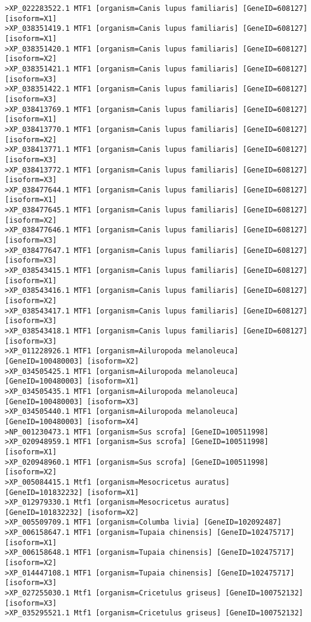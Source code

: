 \begin{lstlisting}[basicstyle=\tiny\ttfamily]
>XP_022283522.1 MTF1 [organism=Canis lupus familiaris] [GeneID=608127] [isoform=X1]
>XP_038351419.1 MTF1 [organism=Canis lupus familiaris] [GeneID=608127] [isoform=X1]
>XP_038351420.1 MTF1 [organism=Canis lupus familiaris] [GeneID=608127] [isoform=X2]
>XP_038351421.1 MTF1 [organism=Canis lupus familiaris] [GeneID=608127] [isoform=X3]
>XP_038351422.1 MTF1 [organism=Canis lupus familiaris] [GeneID=608127] [isoform=X3]
>XP_038413769.1 MTF1 [organism=Canis lupus familiaris] [GeneID=608127] [isoform=X1]
>XP_038413770.1 MTF1 [organism=Canis lupus familiaris] [GeneID=608127] [isoform=X2]
>XP_038413771.1 MTF1 [organism=Canis lupus familiaris] [GeneID=608127] [isoform=X3]
>XP_038413772.1 MTF1 [organism=Canis lupus familiaris] [GeneID=608127] [isoform=X3]
>XP_038477644.1 MTF1 [organism=Canis lupus familiaris] [GeneID=608127] [isoform=X1]
>XP_038477645.1 MTF1 [organism=Canis lupus familiaris] [GeneID=608127] [isoform=X2]
>XP_038477646.1 MTF1 [organism=Canis lupus familiaris] [GeneID=608127] [isoform=X3]
>XP_038477647.1 MTF1 [organism=Canis lupus familiaris] [GeneID=608127] [isoform=X3]
>XP_038543415.1 MTF1 [organism=Canis lupus familiaris] [GeneID=608127] [isoform=X1]
>XP_038543416.1 MTF1 [organism=Canis lupus familiaris] [GeneID=608127] [isoform=X2]
>XP_038543417.1 MTF1 [organism=Canis lupus familiaris] [GeneID=608127] [isoform=X3]
>XP_038543418.1 MTF1 [organism=Canis lupus familiaris] [GeneID=608127] [isoform=X3]
>XP_011228926.1 MTF1 [organism=Ailuropoda melanoleuca] [GeneID=100480003] [isoform=X2]
>XP_034505425.1 MTF1 [organism=Ailuropoda melanoleuca] [GeneID=100480003] [isoform=X1]
>XP_034505435.1 MTF1 [organism=Ailuropoda melanoleuca] [GeneID=100480003] [isoform=X3]
>XP_034505440.1 MTF1 [organism=Ailuropoda melanoleuca] [GeneID=100480003] [isoform=X4]
>NP_001230473.1 MTF1 [organism=Sus scrofa] [GeneID=100511998]
>XP_020948959.1 MTF1 [organism=Sus scrofa] [GeneID=100511998] [isoform=X1]
>XP_020948960.1 MTF1 [organism=Sus scrofa] [GeneID=100511998] [isoform=X2]
>XP_005084415.1 Mtf1 [organism=Mesocricetus auratus] [GeneID=101832232] [isoform=X1]
>XP_012979330.1 Mtf1 [organism=Mesocricetus auratus] [GeneID=101832232] [isoform=X2]
>XP_005509709.1 MTF1 [organism=Columba livia] [GeneID=102092487]
>XP_006158647.1 MTF1 [organism=Tupaia chinensis] [GeneID=102475717] [isoform=X1]
>XP_006158648.1 MTF1 [organism=Tupaia chinensis] [GeneID=102475717] [isoform=X2]
>XP_014447108.1 MTF1 [organism=Tupaia chinensis] [GeneID=102475717] [isoform=X3]
>XP_027255030.1 Mtf1 [organism=Cricetulus griseus] [GeneID=100752132] [isoform=X3]
>XP_035295521.1 Mtf1 [organism=Cricetulus griseus] [GeneID=100752132]

\end{lstlisting}
